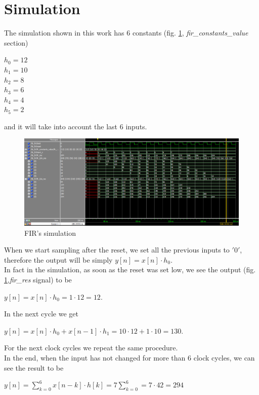 \section{Simulation}
The simulation shown in this work has 6 constants (fig. \ref{fig:fir_sim}, \textit{fir\_constants\_value} section)
\begin{center}
	$ h_{0}=12$\\
	$h_{1}=10$\\
	$h_{2}= 8$\\
	$h_{3}= 6$\\
	$h_{4}= 4$\\
	$h_{5}= 2$\\
\end{center}
and it will take into account the last 6 inputs.\\
\begin{figure}[h!]
	\centering
	\includegraphics[width=\textwidth]{imm/fir/fir_sim.png}  
	\caption{FIR's simulation} 
	\label{fig:fir_sim}
\end{figure}
When we start sampling after the reset, we set all the previous inputs to $ '0' $, therefore the output will be simply $ y[n]=x[n]\cdot h_{0} $.\\
In fact in the simulation, as soon as the reset was set low, we see the output (fig. \ref{fig:fir_sim},\textit{fir\_res} signal) to be\begin{center}
	 $ y[n]=x[n]\cdot h_{0}=1\cdot12=12 $.
\end{center}
In the next cycle we get \begin{center}
	$ y[n]=x[n]\cdot h_{0}+x[n-1]\cdot h_{1}=10\cdot12+1\cdot 10=130 $.
\end{center}
For the next clock cycles we repeat the same procedure.\\
In the end, when the input has not changed for more than 6 clock cycles, we can see the result to be 
\begin{center}
	$ y[n]=\sum\limits_{k=0}^{6 } x[n-k]\cdot h[k]=7\sum\limits_{k=0}^{6 }=7\cdot42=294$
\end{center}

